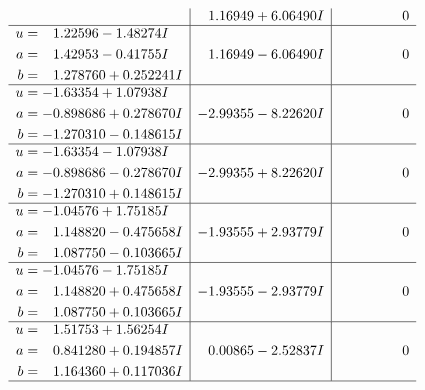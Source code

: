 \documentclass[1p]{elsarticle_modified}
\theoremstyle{definition}
\begin{document}
$$\begin{array}{c|c|c}
 & \phantom{-}1.16949 + 6.06490 I & \phantom{-0.000000 } 0 \\ \hline\begin{aligned}
u &= \phantom{-}1.22596 - 1.48274 I \\
a &= \phantom{-}1.42953 - 0.41755 I \\
b &= \phantom{-}1.278760 + 0.252241 I\end{aligned}
 & \phantom{-}1.16949 - 6.06490 I & \phantom{-0.000000 } 0 \\ \hline\begin{aligned}
u &= -1.63354 + 1.07938 I \\
a &= -0.898686 + 0.278670 I \\
b &= -1.270310 - 0.148615 I\end{aligned}
 & -2.99355 - 8.22620 I & \phantom{-0.000000 } 0 \\ \hline\begin{aligned}
u &= -1.63354 - 1.07938 I \\
a &= -0.898686 - 0.278670 I \\
b &= -1.270310 + 0.148615 I\end{aligned}
 & -2.99355 + 8.22620 I & \phantom{-0.000000 } 0 \\ \hline\begin{aligned}
u &= -1.04576 + 1.75185 I \\
a &= \phantom{-}1.148820 - 0.475658 I \\
b &= \phantom{-}1.087750 - 0.103665 I\end{aligned}
 & -1.93555 + 2.93779 I & \phantom{-0.000000 } 0 \\ \hline\begin{aligned}
u &= -1.04576 - 1.75185 I \\
a &= \phantom{-}1.148820 + 0.475658 I \\
b &= \phantom{-}1.087750 + 0.103665 I\end{aligned}
 & -1.93555 - 2.93779 I & \phantom{-0.000000 } 0 \\ \hline\begin{aligned}
u &= \phantom{-}1.51753 + 1.56254 I \\
a &= \phantom{-}0.841280 + 0.194857 I \\
b &= \phantom{-}1.164360 + 0.117036 I\end{aligned}
 & \phantom{-}0.00865 - 2.52837 I & \phantom{-0.000000 } 0\\
 \hline 
 \end{array}$$\newpage$$\begin{array}{c|c|c}  

\end{array}$$
\end{document}
